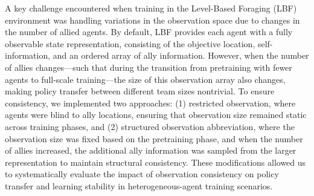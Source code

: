 \documentclass{article}
\begin{document}




A key challenge encountered when training in the Level-Based Foraging (LBF) environment 
was handling variations in the observation space due to changes in the number of allied agents. 
By default, LBF provides each agent with a fully observable state representation, 
consisting of the objective location, self-information, and an ordered array of ally information. 
However, when the number of allies changes—such that during the transition from pretraining 
with fewer agents to full-scale training—the size of this observation array also changes, 
making policy transfer between different team sizes nontrivial. 
To ensure consistency, we implemented two approaches: 
(1) restricted observation, where agents were blind to ally locations, 
ensuring that observation size remained static across training phases, and 
(2) structured observation abbreviation, where the observation size was fixed based 
on the pretraining phase, and when the number of allies increased, the additional ally 
information was sampled from the larger representation to maintain structural consistency. 
These modifications allowed us to systematically evaluate the impact of observation 
consistency on policy transfer and learning stability in heterogeneous-agent training scenarios.
\end{document}
